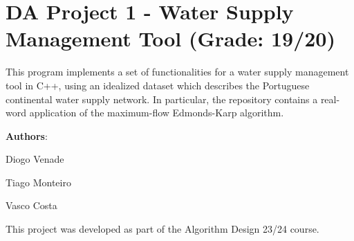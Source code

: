 \chapter{DA Project 1 -\/ Water Supply Management Tool (Grade\+: 19/20)}
\hypertarget{md__c_1_2_users_2diogo_2code_2da_2da-water-supply_2_r_e_a_d_m_e}{}\label{md__c_1_2_users_2diogo_2code_2da_2da-water-supply_2_r_e_a_d_m_e}
\label{md__c_1_2_users_2diogo_2code_2da_2da-water-supply_2_r_e_a_d_m_e_autotoc_md0}%
%


This program implements a set of functionalities for a water supply management tool in C++, using an idealized dataset which describes the Portuguese continental water supply network. In particular, the repository contains a real-\/word application of the maximum-\/flow Edmonds-\/\+Karp algorithm.

{\bfseries{Authors}}\+:
\begin{DoxyItemize}
\item Diogo Venade
\item Tiago Monteiro
\item Vasco Costa
\end{DoxyItemize}

This project was developed as part of the Algorithm Design 23/24 course. 